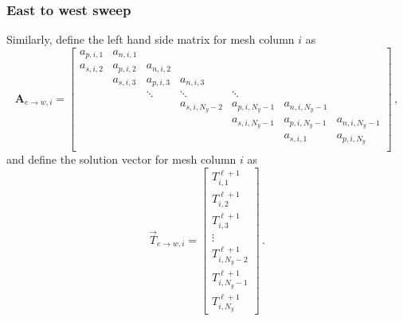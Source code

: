 \documentclass{article}
\begin{document}
\subsubsection*{East to west sweep}

Similarly, define the left hand side matrix for mesh column $i$ as
\begin{equation}
	\label{eq:lhs_i}
	\mathbf{A}_{e\to w, i} =
	\begin{bmatrix}
		a_{p,i,1} & a_{n,i,1} \\
		a_{s,i,2} & a_{p,i,2} & a_{n,i,2} \\
		& a_{s,i,3} & a_{p,i,3} & a_{n,i,3} \\
		& & \ddots & \ddots & \ddots \\
		& & &  a_{s, i, N_y - 2} & a_{p, i, N_y - 1} & a_{n, i, N_y - 1} \\
		& & & & a_{s, i, N_y - 1} & a_{p, i, N_y - 1} & a_{n, i, N_y - 1} \\
		& & & & & a_{s, i, 1} & a_{p, i, N_y} \\
	\end{bmatrix}\,,
\end{equation}
and define the solution vector for mesh column $i$ as
\begin{equation}
	\label{eq:rhs_i}
	\vec{T}_{e\to w, i} =
	\begin{bmatrix}
		T_{i, 1}^{\ell + 1} \\
		T_{i, 2}^{\ell + 1} \\
		T_{i, 3}^{\ell + 1} \\
		\vdots \\
		T_{i, N_y - 2}^{\ell + 1} \\
		T_{i, N_y - 1}^{\ell + 1} \\
		T_{i, N_y}^{\ell + 1}
	\end{bmatrix}\,.
\end{equation}
\end{document}

